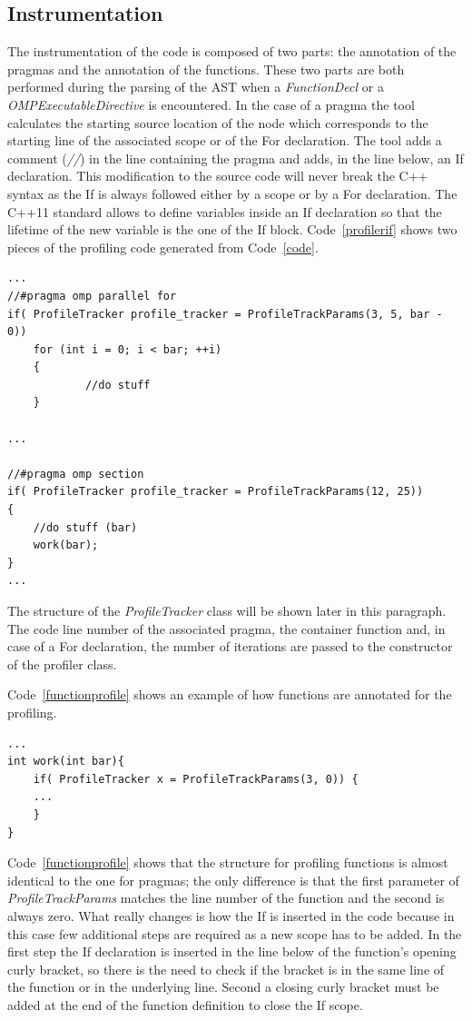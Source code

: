 \documentclass[a4paper,12pt,oneside]{book}
\begin{document}
\subsection{Instrumentation}
The instrumentation of the code is composed of two parts: the annotation of the pragmas and the annotation of the functions. These two parts are both performed during the parsing of the AST when a \emph{FunctionDecl} or a \emph{OMPExecutableDirective} is encountered. In the case of a pragma the tool calculates the starting source location of the node which corresponds to the starting line of the associated scope or of the For declaration. The tool adds a comment (\emph{//}) in the line containing the pragma and adds, in the line below,  an If declaration.  This modification to the source code will never break the C++ syntax as the If is always followed either by a scope or by a For declaration. The C++11 standard allows to define variables inside an If declaration so that the lifetime of the new variable is the one of the If block. Code~\ref{profilerif} shows two pieces of the profiling code generated from Code~\ref{code}.

\begin{lstlisting}[language=CCC, caption=Parts of the profiling code generated from Code~\ref{code}., label=profilerif]
...
//#pragma omp parallel for
if( ProfileTracker profile_tracker = ProfileTrackParams(3, 5, bar - 0))
	for (int i = 0; i < bar; ++i)
	{
    		//do stuff
	}
  
...

//#pragma omp section
if( ProfileTracker profile_tracker = ProfileTrackParams(12, 25))
{
    //do stuff (bar)
    work(bar);
}
...
\end{lstlisting}

The structure of the \emph{ProfileTracker} class will be shown later in this paragraph. The code line number of the associated pragma, the container function and, in case of a For declaration, the number of iterations are passed to the constructor of the profiler class.

Code~\ref{functionprofile} shows an example of how functions are annotated for the profiling. 

\begin{lstlisting}[language=CCC, caption=Example of a profiled function from Code~\ref{code}., label=functionprofile ]
...
int work(int bar){
	if( ProfileTracker x = ProfileTrackParams(3, 0)) {
	...
	}
}
\end{lstlisting}

Code~\ref{functionprofile} shows that the structure for profiling functions is almost identical to the one for pragmas; the only difference is that the first parameter of \emph{ProfileTrackParams} matches the line number of the function and the second is always zero. What really changes is how the If is inserted in the code because in this case few additional steps are required as a new scope has to be added. In the first step the If declaration is inserted in the line below of the function’s opening curly bracket, so there is the need to check if the bracket is in the same line of the function or in the underlying line. Second a closing curly bracket must be added at the end of the function definition to close the If scope.
\end{document}
